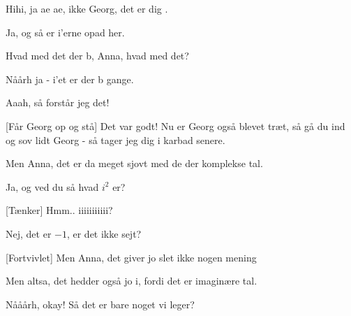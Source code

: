 \documentclass[a4paper,11pt]{article}
\begin{document}
\begin{sketch}
 Hihi, ja ae ae, ikke Georg, det er dig .

 Ja, og så er i'erne opad her.


 Hvad med det der b, Anna, hvad med det?

 Nåårh ja - i'et er der b gange.


 Aaah, så forstår jeg det!

[Får Georg op og stå] Det var godt! Nu er Georg også blevet træt, så gå du ind og sov lidt Georg - så tager jeg dig i karbad senere.


 Men Anna, det er da meget sjovt med de der komplekse tal.

 Ja, og ved du så hvad $i^2$ er?

[Tænker] Hmm.. iiiiiiiiiii?

 Nej, det er $-1$, er det ikke sejt?

[Fortvivlet] Men Anna, det giver jo slet ikke nogen mening 

 Men altsa, det hedder også jo i, fordi det er imaginære tal.

 Nååårh, okay! Så det er bare noget vi leger?

\end{sketch}
\end{document}
